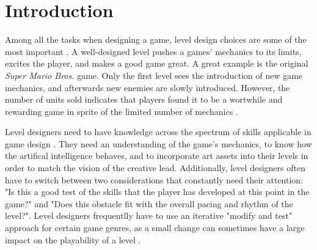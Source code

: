 \section{Introduction}

Among all the tasks when designing a game, level design choices are some of the
most important \cite{blezinski2000, smith2008}. A well-designed level pushes a games' mechanics to its limits,
excites the player, and makes a good game great. A great example is the original
\emph{Super Mario Bros.} game. Only the first level sees the introduction of new
game mechanics, and afterwards new enemies are slowly introduced. However, the
number of units sold indicates that players found it to be a wortwhile and
rewarding game in sprite of the limited number of mechanics \cite{shaker2011}.

Level designers need to have knowledge across the spectrum of skills applicable
in game design \cite{blezinski2000}. They need an understanding of the game's mechanics, to know how
the artifical intelligence behaves, and to incorporate art assets into their 
levels in order to match the vision of the creative lead. Additionally, level
designers often have to switch between two considerations that constantly need
their attention: "Is this a good test of the skills that the player has
developed at this point in the game?" and "Does this obstacle fit with the
overall pacing and rhythm of the level?". Level designers frequentlly have to
use an iterative "modify and test" approach for certain game genres, as a small
change can sometimes have a large impact on the playability of a level \cite{smith2010}.